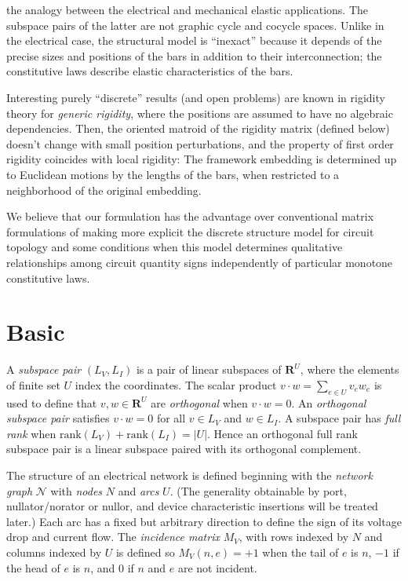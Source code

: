\documentclass{article}
\def\Reals{\ensuremath{\mathbf R}}
\newcommand{\extra}[1]{{\small{#1}}}
\begin{document}
the analogy between the electrical and mechanical elastic 
applications.   
The  subspace 
pairs of the latter 
are not graphic cycle and cocycle spaces.  
Unlike in the electrical case, the structural model is ``inexact'' because
it depends of the precise sizes and positions of
the bars in addition to their interconnection; 
the constitutive laws describe elastic characteristics of the bars.
\extra{

Interesting purely ``discrete'' results (and open problems)
are known in rigidity theory for \textit{generic rigidity}, where
the positions are assumed to have no algebraic dependencies.  Then,
the oriented matroid of the rigidity matrix (defined below)
doesn't change with small position perturbations, and the property
of first order rigidity coincides with local rigidity:  The framework
embedding is determined up to Euclidean motions by the lengths of the
bars, when restricted to a neighborhood of the original embedding.

}We believe that our formulation
has the advantage over conventional matrix formulations
of making more explicit the discrete structure model for circuit 
topology and some conditions when this model determines qualitative
relationships among circuit quantity signs independently of 
particular monotone constitutive laws.

\section{Basic}
\label{sec:Basic}

A \textit{subspace pair} $(L_V, L_I)$ is a pair of linear subspaces of
$\Reals^U$, where the elements of finite set $U$ index the coordinates.
The scalar product $v\cdot w = \sum_{e\in U}v_e w_e$ is used to define that
$v, w \in \Reals^U$ are \textit{orthogonal} when $v\cdot w = 0$.  An 
\textit{orthogonal subspace pair}  satisfies $v\cdot w = 0$ for
all $v\in L_V$ and $w\in L_I$.  A subspace pair has \textit{full rank} when
$\mathrm{rank}(L_V)+\mathrm{rank}(L_I)= |U|$.  Hence an orthogonal full rank 
subspace pair is a linear subspace paired with its orthogonal complement.

The structure of an electrical network is defined 
beginning with the \textit{network graph}
$\mathcal{N}$ with \textit{nodes} $N$  and \textit{arcs} $U$.  
(The generality obtainable by port, nullator/norator or nullor, and 
device characteristic insertions will be treated later.)
Each arc has 
a fixed but arbitrary direction to define the sign of its voltage drop and
current flow.  The \textit{incidence matrix} $M_V$, with rows indexed by $N$
and columns indexed by $U$ is defined so $M_V(n,e)=+1$ when the tail of $e$ is
$n$, $-1$ if the head of $e$ is $n$, and $0$ if $n$ and $e$ are not incident.
\end{document}
